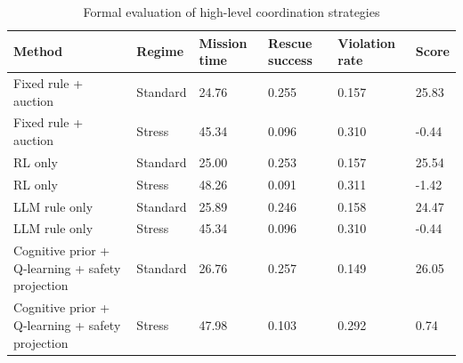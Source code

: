 \begin{table}[htbp]
  \centering
  \caption{Formal evaluation of high-level coordination strategies}
  \label{tab:formal_results}
  \begin{tabular}{p{4.0cm} p{1.6cm} p{1.6cm} p{1.6cm} p{1.6cm} p{1.6cm}}
    \toprule
    Method & Regime & Mission time & Rescue success & Violation rate & Score \\
    \midrule
    Fixed rule + auction & Standard & 24.76 & 0.255 & 0.157 & 25.83 \\
    Fixed rule + auction & Stress & 45.34 & 0.096 & 0.310 & -0.44 \\
    \midrule
    RL only & Standard & 25.00 & 0.253 & 0.157 & 25.54 \\
    RL only & Stress & 48.26 & 0.091 & 0.311 & -1.42 \\
    \midrule
    LLM rule only & Standard & 25.89 & 0.246 & 0.158 & 24.47 \\
    LLM rule only & Stress & 45.34 & 0.096 & 0.310 & -0.44 \\
    \midrule
    Cognitive prior + Q-learning + safety projection & Standard & 26.76 & 0.257 & 0.149 & 26.05 \\
    Cognitive prior + Q-learning + safety projection & Stress & 47.98 & 0.103 & 0.292 & 0.74 \\
    \bottomrule
  \end{tabular}
\end{table}
